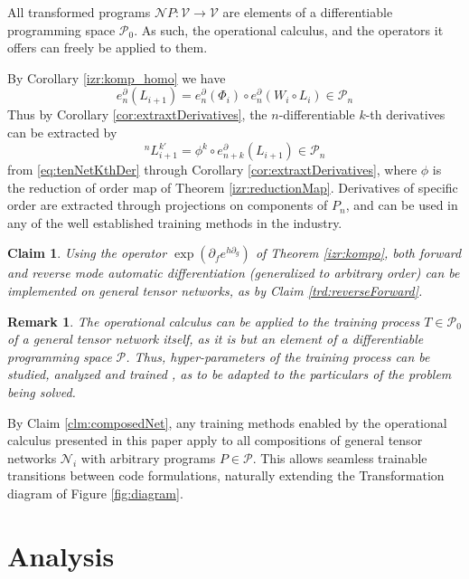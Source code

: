 \documentclass[smallcondensed]{svjour3}
\newcommand{\VV}{\mathcal{V}}
\newcommand{\NN}{\mathcal{N}}
\newcommand{\dP}{\mathcal{P}}
\newcommand{\D}{\partial}
\newtheorem{trditev}{Claim}[section]
\newtheorem{opomba}{Remark}[section]
\begin{document}
All transformed programs $\NN P:\VV\to\VV$ are elements of a differentiable programming space $\dP_0$. As such, the operational calculus, and the operators it offers can freely be applied to them.

By Corollary \ref{izr:komp_homo} we have
\begin{equation}\label{eq:tenNetKthDer}
e^\D_n(L_{i+1})=e^\D_n(\Phi_i)\circ e^\D_n(W_i\circ L_i)\in\dP_n
\end{equation}
Thus by Corollary \ref{cor:extraxtDerivatives}, the $n$-differentiable $k$-th derivatives can be extracted by
\begin{equation}
^{n}L_{i+1}^{k\prime}=\phi^k\circ e^\D_{n+k}(L_{i+1})\in\dP_n
\end{equation}
from \eqref{eq:tenNetKthDer} through Corollary \ref{cor:extraxtDerivatives}, where $\phi$ is the reduction of order map of Theorem \ref{izr:reductionMap}. Derivatives of specific order are extracted through projections on components of $P_n$, and can be used in any of the well established training methods in the industry. 

\begin{trditev}
Using the operator $\exp(\D_fe^{h\D_g})$ of Theorem \ref{izr:kompo}, both forward \cite{PcAD} and reverse \cite{ReverseAD} mode automatic differentiation (generalized to arbitrary order) can be implemented on general tensor networks, as by Claim \ref{trd:reverseForward}.
\end{trditev}

\begin{opomba}
The operational calculus can be applied to the training process $T\in\dP_0$ of a general tensor network itself, as it is but an element of a differentiable programming space $\dP$. Thus, hyper-parameters of the training process \cite{HyperParams} can be studied, analyzed and trained \cite{hyper}, as to be adapted to the particulars of the problem being solved.
\end{opomba}

By Claim \ref{clm:composedNet}, any training methods enabled by the operational calculus presented in this paper apply to all compositions of general tensor networks $\NN_i$ with arbitrary programs $P\in\dP$. This allows seamless trainable transitions between code formulations, naturally extending the Transformation diagram of Figure \ref{fig:diagram}. 
  
\section{Analysis}\label{sec:Analysis}
  
\end{document}
